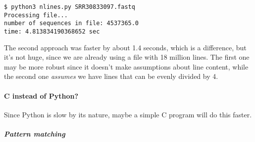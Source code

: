 \begin{Shaded}
\begin{Highlighting}[]

 \NormalTok{) } \NormalTok{:}
\OperatorTok{=} 
\OperatorTok{=} \OperatorTok{/} 

\end{Highlighting}
\end{Shaded}

\begin{verbatim}
$ python3 nlines.py SRR30833097.fastq
Processing file...
number of sequences in file: 4537365.0
time: 4.813834190368652 sec
\end{verbatim}

The second approach was faster by about 1.4 seconds, which is a
difference, but it's not huge, since we are already using a file with 18
million lines. The first one may be more robust since it doesn't make
assumptions about line content, while the second one \emph{assumes} we
have lines that can be evenly divided by 4.

\hypertarget{c-instead-of-python}{%
\paragraph{C instead of Python?}\label{c-instead-of-python}}

Since Python is slow by its nature, maybe a simple C program will do
this faster.

\hypertarget{pattern-matching-1}{%
\subparagraph{Pattern matching}\label{pattern-matching-1}}

